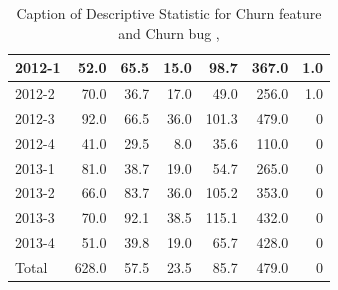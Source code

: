 \documentclass[UKenglish]{ifimaster}  %
\begin{document}
\begin{table}[!htbp]
\begin{adjustwidth}{-2.5cm}{}
{{\begin{tabular}{ | l | r | r | r | r | r | r | }
2012-1 & 52.0 & 65.5 & 15.0 & 98.7 & 367.0 & 1.0\\ \hline
2012-2 & 70.0 & 36.7 & 17.0 & 49.0 & 256.0 & 1.0\\ \hline
2012-3 & 92.0 & 66.5 & 36.0 & 101.3 & 479.0 & 0\\ \hline
2012-4 & 41.0 & 29.5 & 8.0 & 35.6 & 110.0 & 0\\ \hline
2013-1 & 81.0 & 38.7 & 19.0 & 54.7 & 265.0 & 0\\ \hline
2013-2 & 66.0 & 83.7 & 36.0 & 105.2 & 353.0 & 0\\ \hline
2013-3 & 70.0 & 92.1 & 38.5 & 115.1 & 432.0 & 0\\ \hline
2013-4 & 51.0 & 39.8 & 19.0 & 65.7 & 428.0 & 0\\ \hline
Total & 628.0 & 57.5 & 23.5 & 85.7 & 479.0 & 0\\ \hline

\end{tabular}
}
}
\end{adjustwidth}
\caption[Optional caption for list of figures]{Caption of Descriptive Statistic for Churn feature and Churn bug  , }
\label{DS:9:4} %
\end{table}
\end{document}
